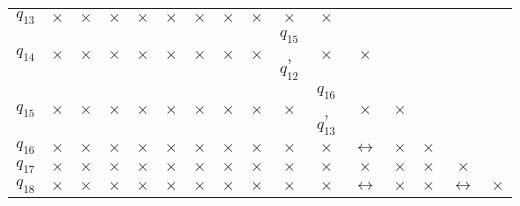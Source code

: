 \documentclass[a4paper,14pt,russian]{extarticle} %
\begin{document}
\begin{sidewaystable}
\begin{tabular}{l c c c c c c c c c c c c c c c }
		\multicolumn{1}{l|}{\({q_{13}}\)}& \multicolumn{1}{c|}{\(\times\)} & \multicolumn{1}{c|}{\(\times\)} & \multicolumn{1}{c|}{\(\times\)} & \multicolumn{1}{c|}{\(\times\)} & \multicolumn{1}{c|}{\(\times\)} & \multicolumn{1}{c|}{\(\times\)} & \multicolumn{1}{c|}{\(\times\)} & \multicolumn{1}{c|}{\(\times\)} & \multicolumn{1}{c|}{\(\times\)} & \multicolumn{1}{c|}{\(\times\)} \\ \cline{2-12}
		\multicolumn{1}{l|}{\({q_{14}}\)}& \multicolumn{1}{c|}{\(\times\)} & \multicolumn{1}{c|}{\(\times\)} & \multicolumn{1}{c|}{\(\times\)} & \multicolumn{1}{c|}{\(\times\)} & \multicolumn{1}{c|}{\(\times\)} & \multicolumn{1}{c|}{\(\times\)} & \multicolumn{1}{c|}{\(\times\)} & \multicolumn{1}{c|}{\(\times\)} & \multicolumn{1}{c|}{\({q_{15}}\), \({q_{12}}\)} & \multicolumn{1}{c|}{\(\times\)} & \multicolumn{1}{c|}{\(\times\)} \\ \cline{2-13}
		\multicolumn{1}{l|}{\({q_{15}}\)}& \multicolumn{1}{c|}{\(\times\)} & \multicolumn{1}{c|}{\(\times\)} & \multicolumn{1}{c|}{\(\times\)} & \multicolumn{1}{c|}{\(\times\)} & \multicolumn{1}{c|}{\(\times\)} & \multicolumn{1}{c|}{\(\times\)} & \multicolumn{1}{c|}{\(\times\)} & \multicolumn{1}{c|}{\(\times\)} & \multicolumn{1}{c|}{\(\times\)} & \multicolumn{1}{c|}{\({q_{16}}\), \({q_{13}}\)} & \multicolumn{1}{c|}{\(\times\)} & \multicolumn{1}{c|}{\(\times\)} \\ \cline{2-14}
		\multicolumn{1}{l|}{\({q_{16}}\)}& \multicolumn{1}{c|}{\(\times\)} & \multicolumn{1}{c|}{\(\times\)} & \multicolumn{1}{c|}{\(\times\)} & \multicolumn{1}{c|}{\(\times\)} & \multicolumn{1}{c|}{\(\times\)} & \multicolumn{1}{c|}{\(\times\)} & \multicolumn{1}{c|}{\(\times\)} & \multicolumn{1}{c|}{\(\times\)} & \multicolumn{1}{c|}{\(\times\)} & \multicolumn{1}{c|}{\(\times\)} & \multicolumn{1}{c|}{\(\leftrightarrow\)} & \multicolumn{1}{c|}{\(\times\)} & \multicolumn{1}{c|}{\(\times\)} \\ \cline{2-15}
		\multicolumn{1}{l|}{\({q_{17}}\)}& \multicolumn{1}{c|}{\(\times\)} & \multicolumn{1}{c|}{\(\times\)} & \multicolumn{1}{c|}{\(\times\)} & \multicolumn{1}{c|}{\(\times\)} & \multicolumn{1}{c|}{\(\times\)} & \multicolumn{1}{c|}{\(\times\)} & \multicolumn{1}{c|}{\(\times\)} & \multicolumn{1}{c|}{\(\times\)} & \multicolumn{1}{c|}{\(\times\)} & \multicolumn{1}{c|}{\(\times\)} & \multicolumn{1}{c|}{\(\times\)} & \multicolumn{1}{c|}{\(\times\)} & \multicolumn{1}{c|}{\(\times\)} & \multicolumn{1}{c|}{\(\times\)} \\ \cline{2-16}
		\multicolumn{1}{l|}{\({q_{18}}\)}& \multicolumn{1}{c|}{\(\times\)} & \multicolumn{1}{c|}{\(\times\)} & \multicolumn{1}{c|}{\(\times\)} & \multicolumn{1}{c|}{\(\times\)} & \multicolumn{1}{c|}{\(\times\)} & \multicolumn{1}{c|}{\(\times\)} & \multicolumn{1}{c|}{\(\times\)} & \multicolumn{1}{c|}{\(\times\)} & \multicolumn{1}{c|}{\(\times\)} & \multicolumn{1}{c|}{\(\times\)} & \multicolumn{1}{c|}{\(\leftrightarrow\)} & \multicolumn{1}{c|}{\(\times\)} & \multicolumn{1}{c|}{\(\times\)} & \multicolumn{1}{c|}{\(\leftrightarrow\)} & \multicolumn{1}{c|}{\(\times\)} \\ 

\end{tabular}
\end{sidewaystable}
\end{document}

